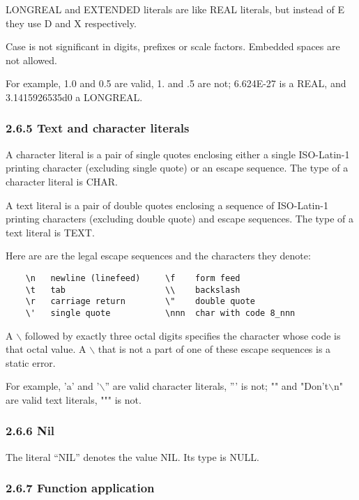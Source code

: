 \documentclass[10pt]{article}
\begin{document}
 LONGREAL and EXTENDED literals are like REAL literals, but instead of E they use D and X respectively. 


 Case is not significant in digits, prefixes or scale factors. Embedded spaces are not allowed. 


  For example, 1.0 and 0.5 are valid, 1. and .5 are not; 6.624E-27 is a REAL, and 3.1415926535d0 a LONGREAL. 


 
\subsubsection*{2.6.5 Text and character literals}


  A character literal is a pair of single quotes enclosing either a single ISO-Latin-1 printing character (excluding single quote) or an escape sequence. The type of a character literal is CHAR. 


 A text literal is a pair of double quotes enclosing a sequence of ISO-Latin-1 printing characters (excluding double quote) and escape sequences. The type of a text literal is TEXT. 


 Here are are the legal escape sequences and the characters they denote: 
\begin{verbatim}
    \n   newline (linefeed)     \f    form feed 
    \t   tab                    \\    backslash 
    \r   carriage return        \"    double quote 
    \'   single quote           \nnn  char with code 8_nnn
\end{verbatim}
 A $\backslash$ followed by exactly three octal digits specifies the character whose code is that octal value. A $\backslash$ that is not a part of one of these escape sequences is a static error. 


  For example, 'a' and '$\backslash$'' are valid character literals, ''' is not; "" and "Don't$\backslash$n" are valid text literals, """ is not. 


 
\subsubsection*{2.6.6 Nil}


  The literal ``NIL'' denotes the value NIL. Its type is NULL. 


 
\subsubsection*{2.6.7 Function application}
\end{document}
